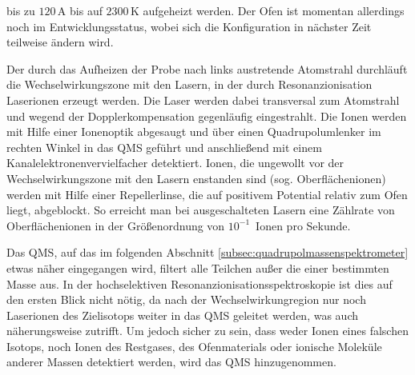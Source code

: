 bis zu $120\,$A bis auf $2300\,$K aufgeheizt werden. Der Ofen
ist momentan allerdings noch im Entwicklungsstatus, wobei sich die Konfiguration
in nächster Zeit teilweise ändern wird.\par
Der durch das Aufheizen der Probe nach links austretende Atomstrahl durchläuft
die Wechselwirkungszone mit den Lasern, in der durch Resonanzionisation
Laserionen erzeugt werden. Die Laser werden dabei transversal zum Atomstrahl
und wegend der Dopplerkompensation gegenläufig eingestrahlt. Die Ionen werden
mit Hilfe einer Ionenoptik abgesaugt und über einen Quadrupolumlenker im rechten Winkel in das QMS geführt und anschließend mit einem Kanalelektronenvervielfacher detektiert. Ionen, die ungewollt vor der
Wechselwirkungszone mit den Lasern enstanden sind (sog.
Oberflächenionen) werden mit Hilfe einer Repellerlinse, die auf positivem
Potential relativ zum Ofen liegt, abgeblockt.
So erreicht man bei ausgeschalteten Lasern eine Zählrate von Oberflächenionen in
der Größenordnung von $10^{-1}\,$ Ionen pro Sekunde.\par
Das QMS, auf das im folgenden Abschnitt \ref{subsec:quadrupolmassenspektrometer}
etwas näher eingegangen wird, filtert alle Teilchen außer die einer bestimmten
Masse aus. In der hochselektiven Resonanzionisationsspektroskopie ist dies auf
den ersten Blick nicht nötig, da nach der Wechselwirkungregion nur noch
Laserionen des Zielisotops weiter in das QMS geleitet werden, was auch
näherungsweise zutrifft. Um jedoch sicher zu sein, dass weder Ionen eines
falschen Isotops, noch Ionen des Restgases, des Ofenmaterials oder ionische
Moleküle anderer Massen detektiert werden, wird das QMS hinzugenommen.


